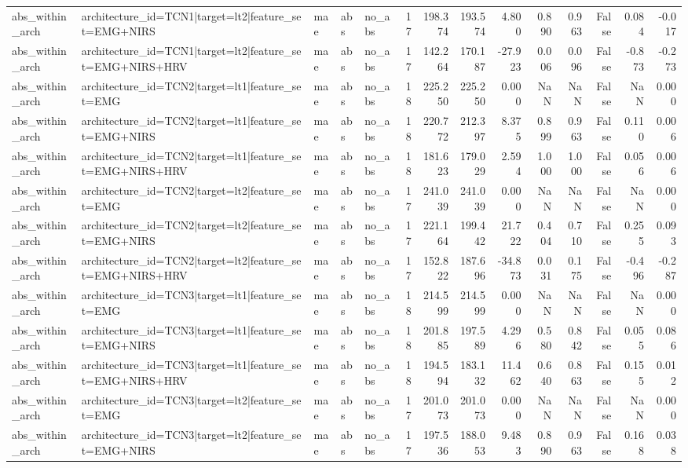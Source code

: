 \begin{table}
\begin{tabular}{lllllrrrrrrrrr}
abs_within_arch & architecture_id=TCN1|target=lt2|feature_set=EMG+NIRS & mae & abs & no_abs & 17 & 198.374 & 193.574 & 4.800 & 0.890 & 0.963 & False & 0.084 & -0.017 \\
abs_within_arch & architecture_id=TCN1|target=lt2|feature_set=EMG+NIRS+HRV & mae & abs & no_abs & 17 & 142.264 & 170.187 & -27.923 & 0.006 & 0.096 & False & -0.873 & -0.273 \\
abs_within_arch & architecture_id=TCN2|target=lt1|feature_set=EMG & mae & abs & no_abs & 18 & 225.250 & 225.250 & 0.000 & NaN & NaN & False & NaN & 0.000 \\
abs_within_arch & architecture_id=TCN2|target=lt1|feature_set=EMG+NIRS & mae & abs & no_abs & 18 & 220.772 & 212.397 & 8.375 & 0.899 & 0.963 & False & 0.110 & 0.006 \\
abs_within_arch & architecture_id=TCN2|target=lt1|feature_set=EMG+NIRS+HRV & mae & abs & no_abs & 18 & 181.623 & 179.029 & 2.594 & 1.000 & 1.000 & False & 0.056 & 0.006 \\
abs_within_arch & architecture_id=TCN2|target=lt2|feature_set=EMG & mae & abs & no_abs & 17 & 241.039 & 241.039 & 0.000 & NaN & NaN & False & NaN & 0.000 \\
abs_within_arch & architecture_id=TCN2|target=lt2|feature_set=EMG+NIRS & mae & abs & no_abs & 17 & 221.164 & 199.442 & 21.722 & 0.404 & 0.710 & False & 0.255 & 0.093 \\
abs_within_arch & architecture_id=TCN2|target=lt2|feature_set=EMG+NIRS+HRV & mae & abs & no_abs & 17 & 152.822 & 187.696 & -34.873 & 0.031 & 0.175 & False & -0.496 & -0.287 \\
abs_within_arch & architecture_id=TCN3|target=lt1|feature_set=EMG & mae & abs & no_abs & 18 & 214.599 & 214.599 & 0.000 & NaN & NaN & False & NaN & 0.000 \\
abs_within_arch & architecture_id=TCN3|target=lt1|feature_set=EMG+NIRS & mae & abs & no_abs & 18 & 201.885 & 197.589 & 4.296 & 0.580 & 0.842 & False & 0.055 & 0.086 \\
abs_within_arch & architecture_id=TCN3|target=lt1|feature_set=EMG+NIRS+HRV & mae & abs & no_abs & 18 & 194.594 & 183.132 & 11.462 & 0.640 & 0.863 & False & 0.155 & 0.012 \\
abs_within_arch & architecture_id=TCN3|target=lt2|feature_set=EMG & mae & abs & no_abs & 17 & 201.073 & 201.073 & 0.000 & NaN & NaN & False & NaN & 0.000 \\
abs_within_arch & architecture_id=TCN3|target=lt2|feature_set=EMG+NIRS & mae & abs & no_abs & 17 & 197.536 & 188.053 & 9.483 & 0.890 & 0.963 & False & 0.168 & 0.038 \\

\end{tabular}
\end{table}
